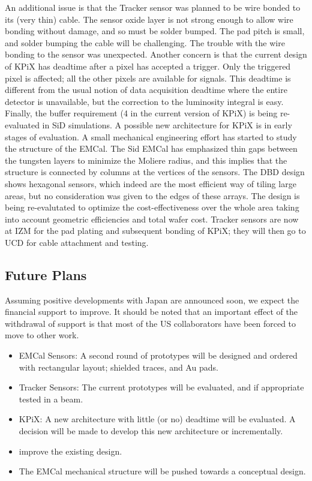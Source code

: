 An additional issue is that the Tracker sensor was planned to be wire bonded to its (very thin) cable. The sensor oxide layer is not strong enough to allow wire bonding without damage, and so must be solder bumped. The pad pitch is small, and solder bumping the cable will be challenging. The trouble with the wire bonding to the sensor was unexpected.
Another concern is that the current design of KPiX has deadtime after a pixel has accepted a trigger. Only the triggered pixel is affected; all the other pixels are available for signals. This deadtime is different from the usual notion of data acquisition deadtime where the entire detector is unavailable, but the correction to the luminosity integral is easy. Finally, the buffer requirement (4 in the current version of KPiX) is being re-evaluated in SiD simulations. A possible new architecture for KPiX is in early stages of evaluation.
A small mechanical engineering effort has started to study the structure of the EMCal. The Sid EMCal has emphasized thin gaps between the tungsten layers to minimize the Moliere radius, and this implies that the structure is connected by columns at the vertices of the sensors. The DBD design shows hexagonal sensors, which indeed are the most efficient way of tiling large areas, but no consideration was given to the edges of these arrays. The design is being re-evalutated to optimize the cost-effectiveness over the whole area taking into account geometric efficiencies and total wafer cost.
Tracker sensors are now at IZM for the pad plating and subsequent bonding of KPiX; they will then go to UCD for cable attachment and testing.
\subsection{Future Plans}
Assuming positive developments with Japan are announced soon, we expect the financial support to improve. It should be noted that an important effect of the withdrawal of support is that most of the US collaborators have been forced to move to other work.
\begin{itemize}
	\item EMCal Sensors: A second round of prototypes will be designed and ordered with rectangular layout; shielded traces, and Au pads.
	\item Tracker Sensors: The current prototypes will be evaluated, and if appropriate tested in a beam.
	\item KPiX: A new architecture with little (or no) deadtime will be evaluated. A decision will be made to develop this new architecture or incrementally.
	\item improve the existing design.
	\item The EMCal mechanical structure will be pushed towards a conceptual design.
\end{itemize}
